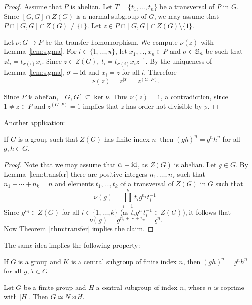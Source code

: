 \begin{proof}
	Assume that $P$ is abelian. Let $T=\{t_1,\dots,t_n\}$ be a transversal of $P$ in $G$. Since 
	$[G,G]\cap Z(G)$ is a normal subgroup of $G$, we may assume that 
	$P\cap [G,G]\cap Z(G)\ne\{1\}$. Let $z\in P\cap [G,G]\cap Z(G)\setminus\{1\}$. 
 
    Let $\nu\colon G\to P$ be the transfer homomorphism. We compute  
    $\nu(z)$ with Lemma~\ref{lem:sigma}. For $i\in\{1,\dots,n\}$, let 
    $x_1,\dots,x_n\in P$ and $\sigma\in\mathbb{S}_n$ be such that 
	$zt_i=t_{\sigma(i)}x_i$. Since $z\in Z(G)$, 
	$t_i=t_{\sigma(i)}x_iz^{-1}$. By the uniqueness of Lemma~\ref{lem:sigma}, 
	$\sigma=\operatorname{id}$ and $x_i=z$ for all $i$. Therefore  
	\[
	\nu(z)=z^{|T|}=z^{(G:P)}. 
	\]

	Since $P$ is abelian, $[G,G]\subseteq\ker\nu$. Thus $\nu(z)=1$, a contradiction, since 
    $1\ne z\in P$ and $z^{(G:P)}=1$ implies that $z$ has order not divisible by $p$. 
\end{proof}




Another application:

\begin{proposition}
	\label{pro:center}
	If $G$ is a group such that $Z(G)$ has finite index $n$, then
	$(gh)^n=g^nh^n$ for all $g,h\in G$.	
\end{proposition}

\begin{proof}
	Note that we may assume that $\alpha=\operatorname{id}$, as $Z(G)$ is
	abelian. Let $g\in G$. By Lemma~\ref{lem:transfer} there are positive integers 
    $n_1,\dots,n_k$ such that $n_1+\cdots+n_k=n$ and elements 
	$t_1,\dots,t_k$ of a transversal of $Z(G)$ in $G$ such that 
	\[
		\nu(g)=\prod_{i=1}^k t_ig^{n_1}t_i^{-1}.
	\]
	Since $g^{n_i}\in Z(G)$ for all $i\in\{1,\dots,k\}$ (as $t_ig^{n_i}t_i^{-1}\in Z(G)$), 
	it follows that 
	\[
	\nu(g)=g^{n_1+\cdots+n_k}=g^n.
	\]
	Now Theorem~\ref{thm:transfer} implies the claim.
\end{proof}

The same idea implies the following property:

\begin{exercise}
\label{xca:K_central}
	If $G$ is a group and $K$ is a central subgroup of finite index $n$, then
	$(gh)^n=g^nh^n$ for all $g,h\in G$.	
\end{exercise}

\begin{proposition}
	\label{prop:semidirecto}
	Let $G$ be a finite group and $H$ a central subgroup of index $n$, where 
	$n$ is coprime with $|H|$. Then
	$G\simeq N\rtimes H$.
\end{proposition}

